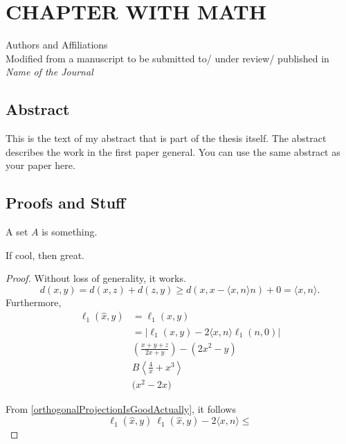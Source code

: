 \newcommand{\RipsD}{\operatorname{Rips}_1}
\newcommand{\Rips}{\operatorname{Rips}}
\newcommand{\ver}{\operatorname{ver}}
\newcommand{\diam}{\operatorname{Diam}}
\newcommand{\midR}{\operatorname{mid}}
\newcommand{\dN}{N_1^*}

\chapter{CHAPTER WITH MATH}
\begin{center}
  Authors and Affiliations \\
  Modified from a manuscript to be submitted to/ under review/ published in \textit{Name of the Journal}
\end{center}

\section{Abstract}
This is the text of my abstract that is part of the thesis itself.
The abstract describes the work in the first paper general. You can use the same abstract as your paper here.
\section{Proofs and Stuff}
\begin{definition}
  A set $A$ is something.
\end{definition}

\begin{lemma}
  If cool, then great.
  \label{lem2}
\end{lemma}
\begin{proof}
  Without loss of generality, it works.
  \begin{equation}
    \label{orthogonalProjectionIsGoodActually}
    d(x,y)= d(x,z)+d(z,y) \geq d(x,x-\langle x,n\rangle n )+0 = \langle x,n\rangle.
  \end{equation}
  Furthermore,
  \begin{align}
    \ell_1(\hat{x},y) & = \ell_1 (x,y)                                        \\
                      & =|\ell_1(x,y)-2\langle x,n\rangle \ell_1(n,0)|        \\
                      & \left(\frac{x+y+z}{2x+y}\right) - \left(2x^2-y\right) \\
                      & B\left\langle \frac{4}{x}+x^3\right\rangle            \\
                      & \Bigg(x^2-2x\Bigg)
  \end{align}

  From \autoref{orthogonalProjectionIsGoodActually}, it follows \[\ell_1(\hat{x},y)\ \ell_1(\hat{x},y)-2\langle x,n\rangle \leq\]
\end{proof}

